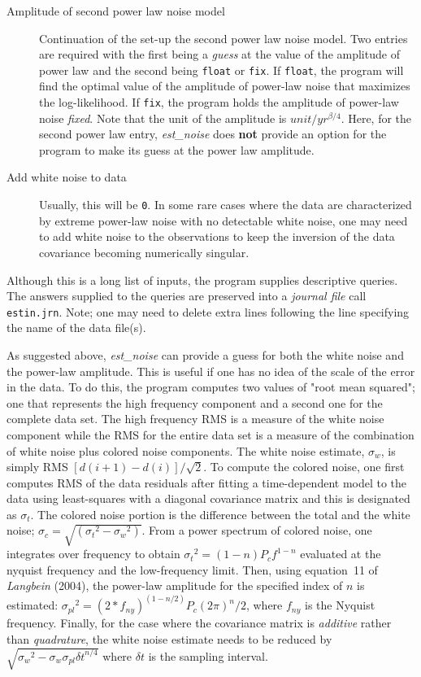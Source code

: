 \documentclass[12pt]{amsart}
\begin{document}
\begin{description}
\item[Amplitude of second power law noise model] Continuation of the set-up the second power law noise model. Two entries are required
with the first being a \textit{guess} at the value of the amplitude of power law and the second being \texttt{float} or \texttt{fix}.
If \texttt{float}, the program will find the optimal value of the amplitude of power-law noise that maximizes the log-likelihood. If \texttt{fix},
the program holds the amplitude of power-law noise \textit{fixed}. Note that the unit of the amplitude is $unit/{yr^{{\beta}/4}}$.
Here, for the second power law entry, \textit{est\_noise} does \textbf{not} provide an option for the program to make
its guess at the power law amplitude.

\item[Add white noise to data] Usually, this will be \texttt{0}.  In some rare cases where the data are characterized
by extreme power-law noise with no detectable white noise, one may need to add white noise to the observations
to keep the inversion of the data covariance becoming numerically singular.

\end{description}

Although this is a long list of inputs, the program supplies descriptive queries.  The answers supplied to the queries
are preserved into a \textit{journal file} call \texttt{estin.jrn}. Note; one may need to delete extra lines following the
line specifying the name of the data file(s).

As suggested above, \textit{est\_noise} can provide a guess for both the white noise and the power-law amplitude. This
is useful if one has no idea of the scale of the error in the data.
To do this, the program computes two values of "root mean squared"; one that represents the high frequency component
and a second one for the complete data set.  The high frequency RMS is a measure of the white noise component while
the RMS for the entire data set is a measure of the combination of white noise plus colored noise components. The
white noise estimate, $\sigma_w$, is simply RMS $[d(i+1)-d(i)]/ \sqrt{2}$.  To compute the colored noise, one first computes
RMS of the data residuals after fitting a time-dependent model to the data using least-squares with a diagonal covariance matrix
and this is designated as $\sigma_t$.  The colored noise portion is the difference between the total and the white noise;
$\sigma_c = \sqrt { ( {\sigma_t}^2 - {\sigma_w}^2 )}$.  From a power spectrum of colored noise, one integrates over
frequency to obtain  ${\sigma_t}^2 = (1-n) P_c f ^ {1-n}$ evaluated at the nyquist frequency and the low-frequency limit.
Then, using equation~11 of \textit{Langbein} (2004), the power-law amplitude for the specified index of $n$ is estimated:
${\sigma_{pl}}^2 = (2*f_{ny})^{(1 - n/2)} P_c (2 \pi)^n / 2$, where $f_{ny}$ is the Nyquist frequency.  Finally, for the case
where the covariance matrix is \textit{additive} rather than \textit{quadrature}, the white noise estimate needs to be reduced by
$\sqrt {{\sigma_w}^2 - \sigma_w  \sigma_{pl} {\delta t}^{n/4} }$ where $ {\delta t}$ is the sampling interval.
\end{document}
